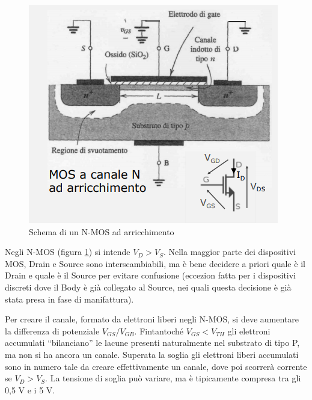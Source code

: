 \documentclass{article}
\begin{document}
\begin{figure}[h]
  \centering
  \includegraphics[scale=0.7]{IM_MOS_bis}
  \caption{Schema di un N-MOS ad arricchimento}
  \label{Schema_MOS_bis}
\end{figure}

Negli N-MOS (figura \ref{Schema_MOS_bis}) si intende $V_D > V_S$. Nella maggior parte dei dispositivi MOS, Drain e Source sono interscambiabili, ma è bene decidere a priori quale è il Drain e quale è il Source per evitare confusione (eccezion fatta per i dispositivi discreti dove il Body è già collegato al Source, nei quali questa decisione è già stata presa in fase di manifattura). 

\vspace{3mm}

Per creare il canale, formato da elettroni liberi negli N-MOS, si deve aumentare la differenza di potenziale $V_{GS}/V_{GB}$. Fintantoché $V_{GS} < V_{TH}$ gli elettroni accumulati ``bilanciano'' le lacune presenti naturalmente nel substrato di tipo P, ma non si ha ancora un canale. Superata la soglia gli elettroni liberi accumulati sono in numero tale da creare effettivamente un canale, dove poi scorrerà corrente se $V_D > V_S$. La tensione di soglia può variare, ma è tipicamente compresa tra gli 0,5 V e i 5 V.

\vspace{3mm}
\end{document}
